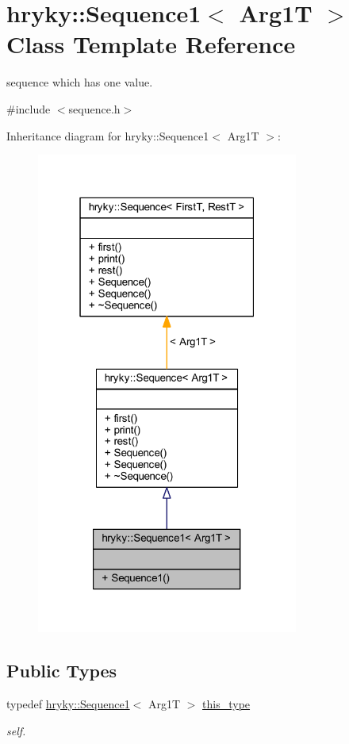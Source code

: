 \hypertarget{classhryky_1_1_sequence1}{\section{hryky\-:\-:Sequence1$<$ Arg1\-T $>$ Class Template Reference}
\label{classhryky_1_1_sequence1}
}


sequence which has one value.  




{\ttfamily \#include $<$sequence.\-h$>$}



Inheritance diagram for hryky\-:\-:Sequence1$<$ Arg1\-T $>$\-:\nopagebreak
\begin{figure}[H]
\begin{center}
\leavevmode
\includegraphics[width=244pt]{classhryky_1_1_sequence1__inherit__graph}
\end{center}
\end{figure}
\subsection*{Public Types}
\begin{DoxyCompactItemize}
\item 
\hypertarget{classhryky_1_1_sequence1_af451c286d34abda4db99b95d9bd6622d}{typedef \hyperlink{classhryky_1_1_sequence1}{hryky\-::\-Sequence1}$<$ Arg1\-T $>$ \hyperlink{classhryky_1_1_sequence1_af451c286d34abda4db99b95d9bd6622d}{this\-\_\-type}}\label{classhryky_1_1_sequence1_af451c286d34abda4db99b95d9bd6622d}

\begin{DoxyCompactList}\small\item\em self. \end{DoxyCompactList}\end{DoxyCompactItemize}
